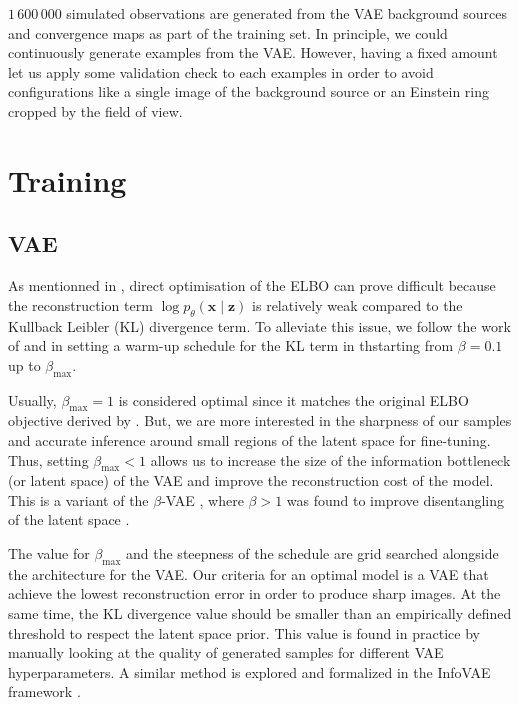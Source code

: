 $1\,600\,000$ simulated observations are generated from the VAE 
background sources and convergence maps as part of the training set. 
In principle, we could continuously generate examples from the VAE. 
However, having a fixed amount let us apply some validation check to each 
examples in order to avoid configurations like a
single image of the background 
source or an Einstein ring cropped by the field of view.




\section{Training}\label{sec:training}

\subsection{VAE}\label{sec:vae training}

As mentionned in \citet{Kingma2019}, direct optimisation 
of the ELBO can prove difficult because the reconstruction term $\log p_\theta (\mathbf{x} \mid \mathbf{z})$ 
is relatively weak compared to the Kullback Leibler (KL) divergence term. To alleviate this issue, 
we follow the work of \citet{Bowman2015} and \citet{Sonderby2016} in setting a warm-up 
schedule for the KL term in thstarting from $\beta=0.1$ up to $\beta_{\mathrm{max}}$. 

Usually, 
$\beta_{\mathrm{max}} = 1$ is considered optimal since it matches the original ELBO  
objective derived by \citet{Kingma2013}. 
But, we are more interested in the 
sharpness of our samples and accurate inference around small regions of the latent 
space for fine-tuning. Thus, setting $\beta_{\mathrm{max}} < 1$ allows us to increase 
the size of the information bottleneck (or latent space) of the VAE 
and improve the reconstruction cost of the model. 
This is a variant of the $\beta$-VAE \citep{Higgins2017}, where $\beta > 1$ was found 
to improve disentangling of the latent space \citep{Burgess2018}. 

The value for $\beta_\mathrm{max}$ and the steepness of the schedule 
are grid searched alongside the architecture for the VAE. Our criteria 
for an optimal model is a VAE that achieve the lowest reconstruction error 
in order to produce sharp images. At the same time, the 
KL divergence value should be smaller than an empirically defined threshold to respect 
the latent space prior. 
This value is found in practice by 
manually looking at the quality of generated samples for different VAE 
hyperparameters. A similar method is explored and formalized in the 
InfoVAE framework \citep{Zhao2017}.


